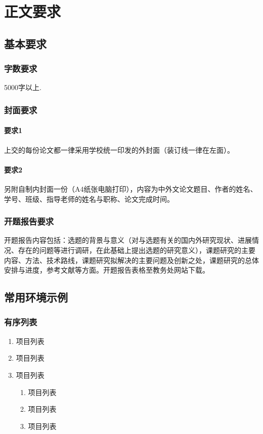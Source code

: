 \chapter{正文要求}\label{chap3}

\section{基本要求}

\subsection{字数要求}

5000字以上. 

\subsection{封面要求}

\subsubsection{要求1}  
上交的每份论文都一律采用学校统一印发的外封面（装订线一律在左面）。

\subsubsection{要求2}
另附自制内封面一份（A4纸张电脑打印），内容为中外文论文题目、作者的姓名、学号、班级、指导老师的姓名与职称、论文完成时间。

\subsection{开题报告要求}
开题报告内容包括：选题的背景与意义（对与选题有关的国内外研究现状、进展情况、存在的问题等进行调研，在此基础上提出选题的研究意义），课题研究的主要内容、方法、技术路线，课题研究拟解决的主要问题及创新之处，课题研究的总体安排与进度，参考文献等方面。开题报告表格至教务处网站下载。

\section{常用环境示例}


\subsection{有序列表}
\begin{enumerate}
	\item
	项目列表
	\item
	项目列表
	\item
	项目列表
	
	\begin{enumerate}
		\item
		项目列表
		\item
		项目列表
		\item
		项目列表
	\end{enumerate}
\end{enumerate}

